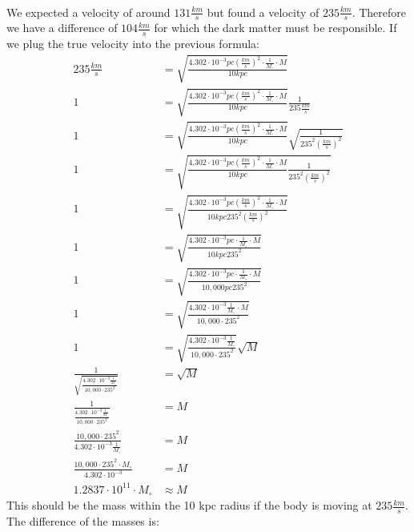 \\
We expected a velocity of around $131 \frac{km}{s}$ but found a velocity of $235 \frac{km}{s}$. Therefore
we have a difference of $104 \frac{km}{s}$ for which the dark matter must be responsible. If we plug the
true velocity into the previous formula:
\begin{equation*}
  \begin{split}
    235 \frac{km}{s} &= \sqrt{\frac{4.302 \cdot 10^{-3} pc (\frac{km}{s})^2 \cdot \frac{1}{M_{\circ}} \cdot M}{10 kpc}}\\
    1 &= \sqrt{\frac{4.302 \cdot 10^{-3} pc (\frac{km}{s})^2 \cdot \frac{1}{M_{\circ}} \cdot M}{10 kpc}} \frac{1}{235 \frac{km}{s}}\\
    1 &= \sqrt{\frac{4.302 \cdot 10^{-3} pc (\frac{km}{s})^2 \cdot \frac{1}{M_{\circ}} \cdot M}{10 kpc}} \sqrt{\frac{1}{235^2 (\frac{km}{s})^2}}\\
    1 &= \sqrt{\frac{4.302 \cdot 10^{-3} pc (\frac{km}{s})^2 \cdot \frac{1}{M_{\circ}} \cdot M}{10 kpc} \frac{1}{235^2 (\frac{km}{s})^2}}\\
    1 &= \sqrt{\frac{4.302 \cdot 10^{-3} pc (\frac{km}{s})^2 \cdot \frac{1}{M_{\circ}} \cdot M}{10 kpc 235^2 (\frac{km}{s})^2}}\\
    1 &= \sqrt{\frac{4.302 \cdot 10^{-3} pc \cdot \frac{1}{M_{\circ}} \cdot M}{10 kpc 235^2}}\\
    1 &= \sqrt{\frac{4.302 \cdot 10^{-3} pc \cdot \frac{1}{M_{\circ}} \cdot M}{10,000 pc 235^2}}\\
    1 &= \sqrt{\frac{4.302 \cdot 10^{-3} \frac{1}{M_{\circ}} \cdot M}{10,000 \cdot 235^2}}\\
    1 &= \sqrt{\frac{4.302 \cdot 10^{-3} \frac{1}{M_{\circ}}}{10,000 \cdot 235^2}} \sqrt{M}\\
    \frac{1}{\sqrt{\frac{4.302 \cdot 10^{-3} \frac{1}{M_{\circ}}}{10,000 \cdot 235^2}}} &= \sqrt{M}\\
    \frac{1}{\frac{4.302 \cdot 10^{-3} \frac{1}{M_{\circ}}}{10,000 \cdot 235^2}} &= M\\
    \frac{10,000 \cdot 235^2}{4.302 \cdot 10^{-3} \frac{1}{M_{\circ}}} &= M\\
    \frac{10,000 \cdot 235^2 \cdot M_{\circ}}{4.302 \cdot 10^{-3}} &= M\\
    1.2837 \cdot 10^{11} \cdot M_{\circ} &\approx M
  \end{split}
\end{equation*}
This should be the mass within the 10 kpc radius if the body is moving at $235 \frac{km}{s}$. The 
difference of the masses is:
